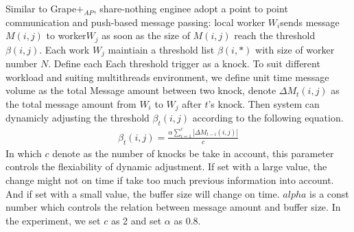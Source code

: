 {Similar to Grape$+_{AP}$,  share-nothing enginee adopt a point to point communication and push-based  message passing: local worker $W_i$sends message $M(i,j)$ to worker$W_j$ as soon as the size of $M(i,j)$ reach the threshold $\beta{(i,j)}$.
Each work $W_j$ maintiain a threshold list $\beta{(i,*)}$ with size of worker number $N$. Define each Each threshold trigger as a knock.
To suit different workload and suiting multithreads environment, we define unit time message volume as the total Message amount between two knock, denote $\Delta M_t(i,j)$ as the total message amount from $W_i$ to $W_j$ after $t$'s knock. Then system can dynamicly adjusting the threshold $\beta_{t}{(i,j)}$ according to the following equation.
\begin{equation}
\begin{aligned}
\beta_t(i,j)=\frac{\alpha\sum_{i=1}^{c}|\Delta M_{t-i}(i,j)|}{c}
\end{aligned}
\end{equation}
In which $c$ denote as the number of knocks be take in account, this parameter controls the flexiability of dynamic adjustment. If set with a large value, the change might not on time if take too much previous information into account. And if set with a small value, the buffer size will change on time. $alpha$ is a const number which controls the relation between message amount and buffer size. In the experiment, we set $c$ as 2 and set $\alpha$ as $0.8$.
}
